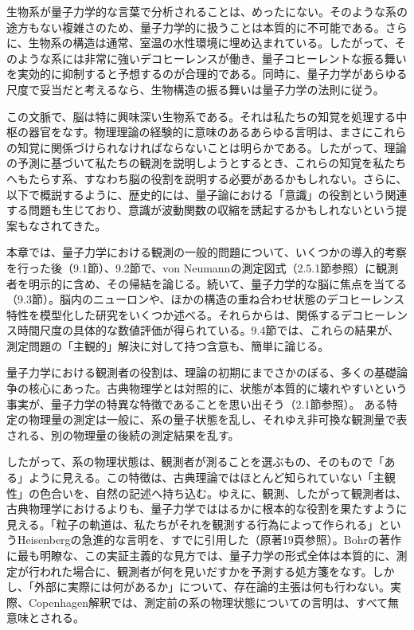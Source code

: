 
\hypertarget{srcpage:359}{}\label{srcpage:359}
\setcounter{footnote}{0}

生物系が量子力学的な言葉で分析されることは、めったにない。そのような系の途方もない複雑さのため、量子力学的に扱うことは本質的に不可能である。さらに、生物系の構造は通常、室温の水性環境に埋め込まれている。したがって、そのような系には非常に強いデコヒーレンスが働き、量子コヒーレントな振る舞いを実効的に抑制すると予想するのが合理的である。同時に、量子力学があらゆる尺度で妥当だと考えるなら、生物構造の振る舞いは量子力学の法則に従う。

この文脈で、脳は特に興味深い生物系である。それは私たちの知覚を処理する中枢の器官をなす。物理理論の経験的に意味のあるあらゆる言明は、まさにこれらの知覚に関係づけられなければならないことは明らかである。したがって、理論の予測に基づいて私たちの観測を説明しようとするとき、これらの知覚を私たちへもたらす系、すなわち脳の役割を説明する必要があるかもしれない。さらに、以下で概説するように、歴史的には、量子論における「意識」の役割という関連する問題も生じており、意識が波動関数の収縮を誘起するかもしれないという提案もなされてきた。

本章では、量子力学における観測の一般的問題について、いくつかの導入的考察を行った後（9.1節）、9.2節で、von Neumannの測定図式（2.5.1節参照）に観測者を明示的に含め、その帰結を論じる。続いて、量子力学的な脳に焦点を当てる（9.3節）。脳内のニューロンや、ほかの構造の重ね合わせ状態のデコヒーレンス特性を模型化した研究をいくつか述べる。それらからは、関係するデコヒーレンス時間尺度の具体的な数値評価が得られている。9.4節では、これらの結果が、測定問題の「主観的」解決に対して持つ含意も、簡単に論じる。

量子力学における観測者の役割は、理論の初期にまでさかのぼる、多くの基礎論争の核心にあった。古典物理学とは対照的に、状態が本質的に壊れやすいという事実が、量子力学の特異な特徴であることを思い出そう（2.1節参照）。
\hypertarget{srcpage:360}{}\label{srcpage:360}
ある特定の物理量の測定は一般に、系の量子状態を乱し、それゆえ非可換な観測量で表される、別の物理量の後続の測定結果を乱す。

したがって、系の物理状態は、観測者が測ることを選ぶもの、そのもので「ある」ように見える。この特徴は、古典理論ではほとんど知られていない「主観性」の色合いを、自然の記述へ持ち込む。ゆえに、観測、したがって観測者は、古典物理学におけるよりも、量子力学でははるかに根本的な役割を果たすように見える。「粒子の軌道は、私たちがそれを観測する行為によって作られる」\cite[185頁]{ref042}というHeisenbergの急進的な言明を、すでに引用した（原著19頁参照）。Bohrの著作に最も明瞭な、この実証主義的な見方では、量子力学の形式全体は本質的に、測定が行われた場合に、観測者が何を見いだすかを予測する処方箋をなす。しかし、「外部に実際には何があるか」について、存在論的主張は何も行わない。実際、Copenhagen解釈では、測定前の系の物理状態についての言明は、すべて無意味とされる。

